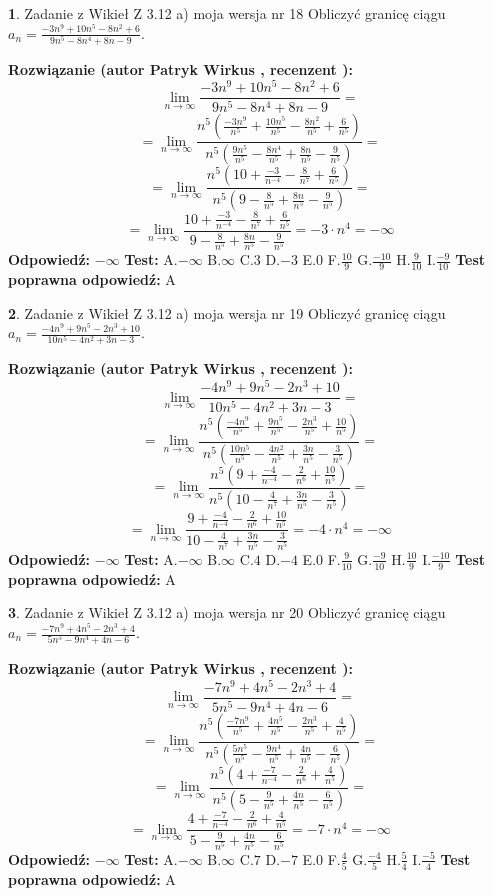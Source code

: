 \documentclass[12pt, a4paper]{article}
\theoremstyle{definition} %
\newtheorem{zad}{}
\newcommand{\zadStart}[1]{\begin{zad}#1\newline}
\newcommand{\zadStop}{\end{zad}}
\newcommand{\rozwStart}[2]{\noindent \textbf{Rozwiązanie (autor #1 , recenzent #2): }\newline}
\newcommand{\rozwStop}{\newline}
\newcommand{\odpStart}{\noindent \textbf{Odpowiedź:}\newline}
\newcommand{\odpStop}{\newline}
\newcommand{\testStart}{\noindent \textbf{Test:}\newline}
\newcommand{\testStop}{\newline}
\newcommand{\kluczStart}{\noindent \textbf{Test poprawna odpowiedź:}\newline}
\newcommand{\kluczStop}{\newline}
\begin{document}
\zadStart{Zadanie z Wikieł Z 3.12 a) moja wersja nr 18}
Obliczyć granicę ciągu $a_{n}=\frac{-3n^{9}+10n^{5}-8n^{2}+6}{9n^{5}-8n^{4}+8n-9}$.
\zadStop
\rozwStart{Patryk Wirkus}{}
$$\lim\limits_{n\to\infty}\frac{-3n^{9}+10n^{5}-8n^{2}+6}{9n^{5}-8n^{4}+8n-9}=$$
$$=\lim\limits_{n\to\infty}\frac{n^{5}\left(\frac{-3n^{9}}{n^{5}}+\frac{10n^{5}}{n^{5}}-\frac{8n^{2}}{n^{5}}+\frac{6}{n^{5}}\right)}{n^{5}\left(\frac{9n^{5}}{n^{5}}-\frac{8n^{4}}{n^{5}}+\frac{8n}{n^{5}}-\frac{9}{n^{5}}\right)}=$$
$$=\lim\limits_{n\to\infty}\frac{n^{5}\left(10+\frac{-3}{n^{-4}}-\frac{8}{n^{7}}+\frac{6}{n^{5}}\right)}
{n^{5}\left(9-\frac{8}{n^{5}}+\frac{8n}{n^{5}}-\frac{9}{n^{5}}\right)}=$$
$$=\lim\limits_{n\to\infty}\frac{10+\frac{-3}{n^{-4}}-\frac{8}{n^{7}}+\frac{6}{n^{5}}}{9-\frac{8}{n^{5}}+\frac{8n}{n^{5}}-\frac{9}{n^{5}}}=-3\cdot n^{4} = -\infty$$
\rozwStop
\odpStart
$-\infty$
\odpStop
\testStart
A.$-\infty$
B.$\infty$
C.$3$
D.$-3$
E.$0$
F.$\frac{10}{9}$
G.$\frac{-10}{9}$
H.$\frac{9}{10}$
I.$\frac{-9}{10}$
\testStop
\kluczStart
A
\kluczStop



\zadStart{Zadanie z Wikieł Z 3.12 a) moja wersja nr 19}
Obliczyć granicę ciągu $a_{n}=\frac{-4n^{9}+9n^{5}-2n^{3}+10}{10n^{5}-4n^{2}+3n-3}$.
\zadStop
\rozwStart{Patryk Wirkus}{}
$$\lim\limits_{n\to\infty}\frac{-4n^{9}+9n^{5}-2n^{3}+10}{10n^{5}-4n^{2}+3n-3}=$$
$$=\lim\limits_{n\to\infty}\frac{n^{5}\left(\frac{-4n^{9}}{n^{5}}+\frac{9n^{5}}{n^{5}}-\frac{2n^{3}}{n^{5}}+\frac{10}{n^{5}}\right)}{n^{5}\left(\frac{10n^{5}}{n^{5}}-\frac{4n^{2}}{n^{5}}+\frac{3n}{n^{5}}-\frac{3}{n^{5}}\right)}=$$
$$=\lim\limits_{n\to\infty}\frac{n^{5}\left(9+\frac{-4}{n^{-4}}-\frac{2}{n^{6}}+\frac{10}{n^{5}}\right)}
{n^{5}\left(10-\frac{4}{n^{7}}+\frac{3n}{n^{5}}-\frac{3}{n^{5}}\right)}=$$
$$=\lim\limits_{n\to\infty}\frac{9+\frac{-4}{n^{-4}}-\frac{2}{n^{6}}+\frac{10}{n^{5}}}{10-\frac{4}{n^{7}}+\frac{3n}{n^{5}}-\frac{3}{n^{5}}}=-4\cdot n^{4} = -\infty$$
\rozwStop
\odpStart
$-\infty$
\odpStop
\testStart
A.$-\infty$
B.$\infty$
C.$4$
D.$-4$
E.$0$
F.$\frac{9}{10}$
G.$\frac{-9}{10}$
H.$\frac{10}{9}$
I.$\frac{-10}{9}$
\testStop
\kluczStart
A
\kluczStop



\zadStart{Zadanie z Wikieł Z 3.12 a) moja wersja nr 20}
Obliczyć granicę ciągu $a_{n}=\frac{-7n^{9}+4n^{5}-2n^{3}+4}{5n^{5}-9n^{4}+4n-6}$.
\zadStop
\rozwStart{Patryk Wirkus}{}
$$\lim\limits_{n\to\infty}\frac{-7n^{9}+4n^{5}-2n^{3}+4}{5n^{5}-9n^{4}+4n-6}=$$
$$=\lim\limits_{n\to\infty}\frac{n^{5}\left(\frac{-7n^{9}}{n^{5}}+\frac{4n^{5}}{n^{5}}-\frac{2n^{3}}{n^{5}}+\frac{4}{n^{5}}\right)}{n^{5}\left(\frac{5n^{5}}{n^{5}}-\frac{9n^{4}}{n^{5}}+\frac{4n}{n^{5}}-\frac{6}{n^{5}}\right)}=$$
$$=\lim\limits_{n\to\infty}\frac{n^{5}\left(4+\frac{-7}{n^{-4}}-\frac{2}{n^{6}}+\frac{4}{n^{5}}\right)}
{n^{5}\left(5-\frac{9}{n^{5}}+\frac{4n}{n^{5}}-\frac{6}{n^{5}}\right)}=$$
$$=\lim\limits_{n\to\infty}\frac{4+\frac{-7}{n^{-4}}-\frac{2}{n^{6}}+\frac{4}{n^{5}}}{5-\frac{9}{n^{5}}+\frac{4n}{n^{5}}-\frac{6}{n^{5}}}=-7\cdot n^{4} = -\infty$$
\rozwStop
\odpStart
$-\infty$
\odpStop
\testStart
A.$-\infty$
B.$\infty$
C.$7$
D.$-7$
E.$0$
F.$\frac{4}{5}$
G.$\frac{-4}{5}$
H.$\frac{5}{4}$
I.$\frac{-5}{4}$
\testStop
\kluczStart
A
\kluczStop
\end{document}
